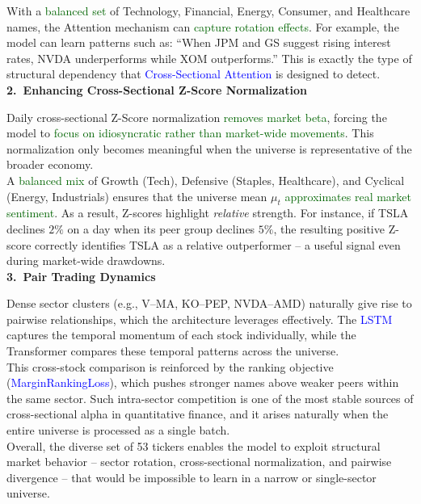 \documentclass[twoside,final]{hcmut-report}
\begin{document}
With a \textcolor{darkgreen}{balanced set} of Technology, Financial, Energy, Consumer, and Healthcare names, the Attention mechanism can \textcolor{darkgreen}{capture rotation effects}. For example, the model can learn patterns such as: ``When JPM and GS suggest rising interest rates, NVDA underperforms while XOM outperforms.'' This is exactly the type of structural dependency that \textcolor{blue}{Cross-Sectional Attention} is designed to detect.\\

\textbf{2.~Enhancing Cross-Sectional Z-Score Normalization}

Daily cross-sectional Z-Score normalization \textcolor{darkgreen}{removes market beta}, forcing the model to \textcolor{darkgreen}{focus on idiosyncratic rather than market-wide movements}. This normalization only becomes meaningful when the universe is representative of the broader economy.\\

A \textcolor{darkgreen}{balanced mix} of Growth (Tech), Defensive (Staples, Healthcare), and Cyclical (Energy, Industrials) ensures that the universe mean $\mu_t$ \textcolor{darkgreen}{approximates real market sentiment}. As a result, Z-scores highlight \emph{relative} strength. For instance, if TSLA declines $2\%$ on a day when its peer group declines $5\%$, the resulting positive Z-score correctly identifies TSLA as a relative outperformer -- a useful signal even during market-wide drawdowns.\\

\textbf{3.~Pair Trading Dynamics}

Dense sector clusters (e.g., V--MA, KO--PEP, NVDA--AMD) naturally give rise to pairwise relationships, which the architecture leverages effectively. The \textcolor{blue}{LSTM} captures the temporal momentum of each stock individually, while the Transformer compares these temporal patterns across the universe.\\

This cross-stock comparison is reinforced by the ranking objective (\textcolor{blue}{MarginRankingLoss}), which pushes stronger names above weaker peers within the same sector. Such intra-sector competition is one of the most stable sources of cross-sectional alpha in quantitative finance, and it arises naturally when the entire universe is processed as a single batch.\\

Overall, the diverse set of 53 tickers enables the model to exploit structural market behavior -- sector rotation, cross-sectional normalization, and pairwise divergence -- that would be impossible to learn in a narrow or single-sector universe.
\end{document}
